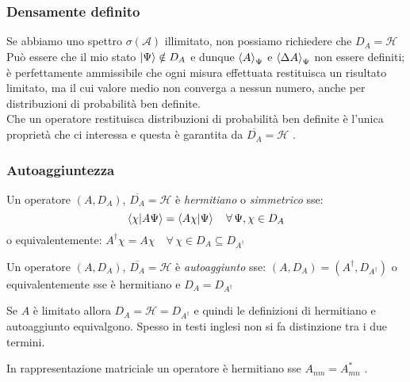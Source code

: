 \subsubsection{Densamente definito}

Se abbiamo uno spettro \(\sigma(\mathcal{A})\) illimitato, non possiamo richiedere che \(D_A = \mathcal{H}\)\\
Può essere che il mio stato \(\ket{\Psi} \notin D_A\) e dunque \(\expval{A}_{\Psi}\) e \(\expval{\Delta A}_{\Psi}\) non essere definiti; 
è perfettamente ammissibile che ogni misura effettuata restituisca un risultato limitato, ma il cui valore medio non converga a nessun numero,
anche per distribuzioni di probabilità ben definite.\\
Che un operatore restituisca distribuzioni di probabilità ben definite è l'unica proprietà che ci interessa e questa è garantita da \(\overline{D_A}= \mathcal{H}\) .

\subsubsection{Autoaggiuntezza}
\begin{definition}
    Un operatore \((A, D_A)\), \(\overline{D_A}= \mathcal{H}\) è \textit{hermitiano} o \textit{simmetrico} sse:
    \begin{equation}
        \braket{\chi}{A\Psi}   = \braket{A\chi}{\Psi} \quad \forall\, \Psi, \chi \in D_A
    \end{equation}  
    o equivalentemente: \(A^\dagger\chi = A\chi \quad   \forall\,\chi   \in D_A\subseteq D_{A^\dagger}\)
\end{definition}
\begin{definition}
    Un operatore \((A, D_A)\), \(\overline{D_A}= \mathcal{H}\) è \textit{autoaggiunto} sse: \((A, D_A)= (A^\dagger, D_{A^\dagger})\) 
    o equivalentemente sse è hermitiano e \(D_A= D_{A^\dagger}\)
\end{definition}

\begin{remark}
    Se \(A \) è limitato allora \(D_A = \mathcal{H}= D_{A^\dagger}\) e quindi le definizioni di hermitiano e autoaggiunto equivalgono.
    Spesso in testi inglesi non si fa distinzione tra i due termini.
\end{remark}
\begin{remark}
    In rappresentazione matriciale un operatore è hermitiano sse \(A_{nm}= A_{mn}^*\) .
\end{remark}

